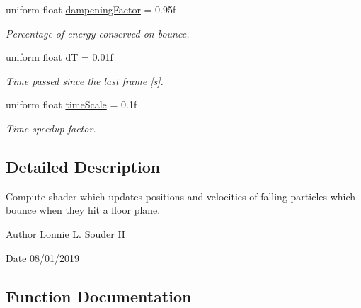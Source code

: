 \begin{DoxyCompactItemize}
uniform float \hyperlink{bouncing__particles_8comp_abf1cc62bbea63dfe4f91fe35f052ae2e}{dampening\+Factor} = 0.\+95f
\begin{DoxyCompactList}\small\item\em Percentage of energy conserved on bounce. \end{DoxyCompactList}\item 
\mbox{\label{bouncing__particles_8comp_afa6fb72b63888e1e0999df05216df22c}} 
uniform float \hyperlink{bouncing__particles_8comp_afa6fb72b63888e1e0999df05216df22c}{dT} = 0.\+01f
\begin{DoxyCompactList}\small\item\em Time passed since the last frame \mbox{[}s\mbox{]}. \end{DoxyCompactList}\item 
\mbox{\label{bouncing__particles_8comp_ada8995d196db18c951ef5fe8de204a08}} 
uniform float \hyperlink{bouncing__particles_8comp_ada8995d196db18c951ef5fe8de204a08}{time\+Scale} = 0.\+1f
\begin{DoxyCompactList}\small\item\em Time speedup factor. \end{DoxyCompactList}\end{DoxyCompactItemize}


\subsection{Detailed Description}
Compute shader which updates positions and velocities of falling particles which bounce when they hit a floor plane. 

\begin{DoxyAuthor}{Author}
Lonnie L. Souder II 
\end{DoxyAuthor}
\begin{DoxyDate}{Date}
08/01/2019 
\end{DoxyDate}


\subsection{Function Documentation}
\mbox{\label{bouncing__particles_8comp_a11c062c4611d15da5fb25a630e7298b9}} 

